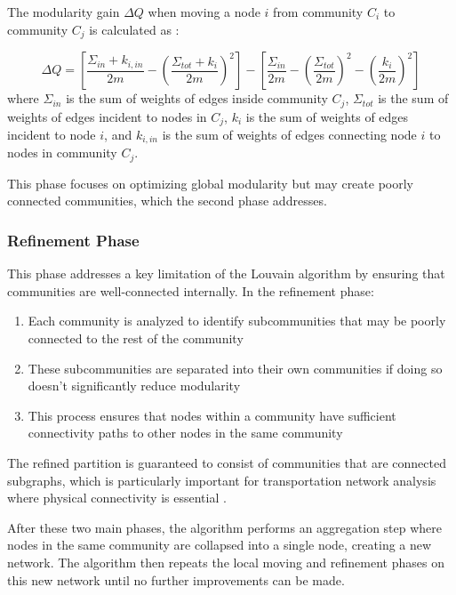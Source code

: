 The modularity gain $\Delta Q$ when moving a node $i$ from community $C_i$ to community $C_j$ is calculated as \cite{blondel2008fast}:

\begin{equation}
    \Delta Q = \left[\frac{\Sigma_{in} + k_{i,in}}{2m} - \left(\frac{\Sigma_{tot} + k_i}{2m}\right)^2\right] - \left[\frac{\Sigma_{in}}{2m} - \left(\frac{\Sigma_{tot}}{2m}\right)^2 - \left(\frac{k_i}{2m}\right)^2\right]
\end{equation}
where $\Sigma_{in}$ is the sum of weights of edges inside community $C_j$, $\Sigma_{tot}$ is the sum of weights of edges incident to nodes in $C_j$, $k_i$ is the sum of weights of edges incident to node $i$, and $k_{i,in}$ is the sum of weights of edges connecting node $i$ to nodes in community $C_j$.

This phase focuses on optimizing global modularity but may create poorly connected communities, which the second phase addresses.

\subsubsection{Refinement Phase}
This phase addresses a key limitation of the Louvain algorithm by ensuring that communities are well-connected internally. In the refinement phase:

\begin{enumerate}
    \item Each community is analyzed to identify subcommunities that may be poorly connected to the rest of the community
    \item These subcommunities are separated into their own communities if doing so doesn't significantly reduce modularity
    \item This process ensures that nodes within a community have sufficient connectivity paths to other nodes in the same community
\end{enumerate}

The refined partition is guaranteed to consist of communities that are connected subgraphs, which is particularly important for transportation network analysis where physical connectivity is essential \cite{traag2019louvain}.

After these two main phases, the algorithm performs an aggregation step where nodes in the same community are collapsed into a single node, creating a new network. The algorithm then repeats the local moving and refinement phases on this new network until no further improvements can be made.

